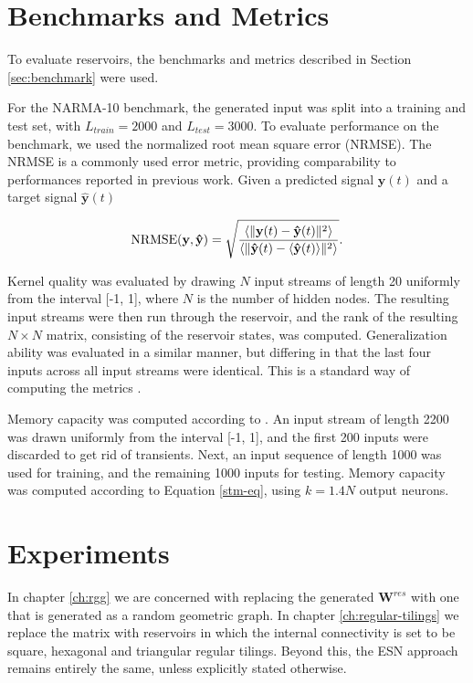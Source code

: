 \section{Benchmarks and Metrics}

To evaluate reservoirs, the benchmarks and metrics described in Section
\ref{sec:benchmark} were used.

For the NARMA-10 benchmark, the generated input was split into a training and
test set, with $L_{train} = 2000$ and $L_{test} = 3000$. To evaluate performance
on the benchmark, we used the normalized root mean square error (NRMSE). The
NRMSE is a commonly used error metric, providing comparability to performances
reported in previous work. Given a predicted signal $\mathbf{y}(t)$ and a target
signal $\mathbf{\hat{y}}(t)$

\begin{equation}
  \textrm{NRMSE}(\mathbf{y}, \mathbf{\hat{y}}) = \sqrt{\frac{
      \langle\Vert \mathbf{y}(t) - \mathbf{\hat{y}}(t) \Vert^{2}\rangle
    }{
      \langle\Vert \mathbf{\hat{y}}(t) - \langle\mathbf{\hat{y}}(t)\rangle \Vert^{2}\rangle
    }
  }
  .
  \label{eq:nrmse}
\end{equation}

Kernel quality was evaluated by drawing $N$ input streams of length 20 uniformly
from the interval [-1, 1], where $N$ is the number of hidden nodes. The
resulting input streams were then run through the reservoir, and the rank of the
resulting $N \times N$ matrix, consisting of the reservoir states, was
computed. Generalization ability was evaluated in a similar manner, but
differing in that the last four inputs across all input streams were
identical. This is a standard way of computing the metrics
\cite{busing_connectivity_2010}.

Memory capacity was computed according to \cite{farkas_computational_2016}. An
input stream of length 2200 was drawn uniformly from the interval [-1, 1], and
the first 200 inputs were discarded to get rid of transients. Next, an input
sequence of length 1000 was used for training, and the remaining 1000 inputs for
testing. Memory capacity was computed according to Equation \ref{stm-eq}, using
$k = 1.4N$ output neurons.

\section{Experiments}

In chapter \ref{ch:rgg} we are concerned with replacing the generated
$\mathbf{W}^{res}$ with one that is generated as a random geometric graph. In
chapter \ref{ch:regular-tilings} we replace the matrix with reservoirs in which
the internal connectivity is set to be square, hexagonal and triangular regular
tilings. Beyond this, the ESN approach remains entirely the same, unless
explicitly stated otherwise.


